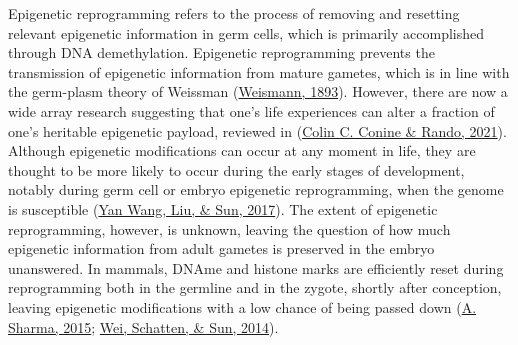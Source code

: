 \documentclass[12pt,twoside]{reedthesis}
\begin{document}
Epigenetic reprogramming refers to the process of removing and resetting
relevant epigenetic information in germ cells, which is primarily
accomplished through DNA demethylation. Epigenetic reprogramming
prevents the transmission of epigenetic information from mature gametes,
which is in line with the germ-plasm theory of Weissman (\protect\hyperlink{ref-weismann1893}{Weismann, 1893}).
However, there are now a wide array research suggesting that one's life
experiences can alter a fraction of one's heritable epigenetic payload,
reviewed in (\protect\hyperlink{ref-conine2021}{Colin C. Conine \& Rando, 2021}). Although epigenetic modifications can occur
at any moment in life, they are thought to be more likely to occur
during the early stages of development, notably during germ cell or
embryo epigenetic reprogramming, when the genome is susceptible
(\protect\hyperlink{ref-wang2017}{Yan Wang, Liu, \& Sun, 2017}). The extent of epigenetic reprogramming, however, is
unknown, leaving the question of how much epigenetic information from
adult gametes is preserved in the embryo unanswered. In mammals, DNAme
and histone marks are efficiently reset during reprogramming both in the
germline and in the zygote, shortly after conception, leaving epigenetic
modifications with a low chance of being passed down (\protect\hyperlink{ref-sharma2015}{A. Sharma, 2015}; \protect\hyperlink{ref-wei2014a}{Wei, Schatten, \& Sun, 2014}).
\end{document}

